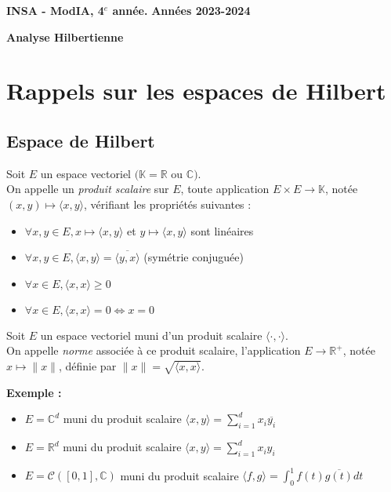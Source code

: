 \documentclass[12pt,a4paper]{article}
\newcommand{\entete}{
    \noindent\textbf{INSA - ModIA, 4$^e$ année.}
    \hfill \textbf{Années 2023-2024}
    
    \begin{center}
        \textbf{\LARGE Analyse Hilbertienne}
    \end{center}
}
\newcommand{\definition}[2]{%
    \begin{tcolorbox}[colback=white,colframe=blue!25!white,title=\textbf{Définition #1}, coltitle=black]
        #2
    \end{tcolorbox}
}
\begin{document}
\entete

\vspace{0.5cm}

\section{Rappels sur les espaces de Hilbert}

\subsection{Espace de Hilbert}

\definition{- Produit scalaire}{
    Soit $E$ un espace vectoriel $(\mathbb{K} = \mathbb{R}$ ou $\mathbb{C})$.\\
    On appelle un \textit{produit scalaire} sur $E$, toute application $E \times E \rightarrow \mathbb{K}$, notée $(x, y) \mapsto \langle x, y \rangle$, vérifiant les propriétés suivantes :
    \begin{itemize}
        \item $\forall x, y \in E, x \mapsto \langle x, y \rangle$ et $y \mapsto \langle x, y \rangle$ sont linéaires
        \item $\forall x, y \in E, \langle x, y \rangle = \overline{\langle y, x \rangle}$ (symétrie conjuguée)
        \item $\forall x \in E, \langle x, x \rangle \geq 0$
        \item $\forall x \in E, \langle x, x \rangle = 0 \Leftrightarrow x = 0$
    \end{itemize}
}

\definition{- Norme}{
    Soit $E$ un espace vectoriel muni d'un produit scalaire $\langle \cdot, \cdot \rangle$.\\
    On appelle \textit{norme} associée à ce produit scalaire, l'application $E \rightarrow \mathbb{R}^+$, notée $x \mapsto \|x\|$, définie par $\|x\| = \sqrt{\langle x, x \rangle}$.
}

\textbf{Exemple :}
\begin{itemize}
    \item $E = \mathbb{C}^d$ muni du produit scalaire $\langle x, y \rangle = \sum_{i=1}^d x_i \overline{y_i}$
    \item $E = \mathbb{R}^d$ muni du produit scalaire $\langle x, y \rangle = \sum_{i=1}^d x_i y_i$
    \item $E = \mathcal{C}([0, 1], \mathbb{C})$ muni du produit scalaire $\langle f, g \rangle = \int_0^1 f(t) \overline{g(t)} dt$
\end{itemize}
\end{document}
